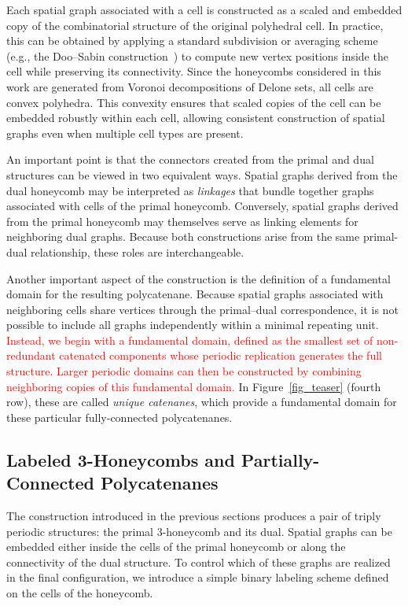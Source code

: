 \documentclass[times,twocolumn,final]{elsarticle}
\begin{document}
Each spatial graph associated with a cell is constructed as a scaled and embedded copy of the combinatorial structure of the original polyhedral cell. In practice, this can be obtained by applying a standard subdivision or averaging scheme (e.g., the Doo--Sabin construction~\cite{doo1998behaviour,akleman2001new}) to compute new vertex positions inside the cell while preserving its connectivity. Since the honeycombs considered in this work are generated from Voronoi decompositions of Delone sets, all cells are convex polyhedra. This convexity ensures that scaled copies of the cell can be embedded robustly within each cell, allowing consistent construction of spatial graphs even when multiple cell types are present.


An important point is that the connectors created from the primal and dual structures can be viewed in
two equivalent ways. Spatial graphs derived from the dual honeycomb may be
interpreted as \emph{linkages} that bundle together graphs associated with
cells of the primal honeycomb. Conversely, spatial graphs derived from the
primal honeycomb may themselves serve as linking elements for neighboring
dual graphs. Because both constructions arise from the same primal-dual
relationship, these roles are interchangeable.

Another important aspect of the construction is the definition of a fundamental domain for the resulting polycatenane. Because spatial graphs associated with neighboring cells share vertices through the primal–dual correspondence, it is not possible to include all graphs independently within a minimal repeating unit. \textcolor{red}{Instead, we begin with a fundamental domain, defined as the smallest set of non-redundant catenated components whose periodic replication generates the full structure. Larger periodic domains can then be constructed by combining neighboring copies of this fundamental domain.} In Figure~\ref{fig_teaser} (fourth row), these are called \emph{unique catenanes}, which provide a fundamental domain for these particular fully-connected polycatenanes.

\subsection{Labeled 3-Honeycombs and Partially-Connected Polycatenanes}

The construction introduced in the previous sections produces a pair of
triply periodic structures: the primal 3-honeycomb and its dual. Spatial
graphs can be embedded either inside the cells of the primal honeycomb or
along the connectivity of the dual structure. To control which of these
graphs are realized in the final configuration, we introduce a simple binary
labeling scheme defined on the cells of the honeycomb.
\end{document}
